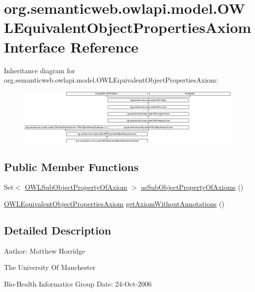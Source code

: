 \hypertarget{interfaceorg_1_1semanticweb_1_1owlapi_1_1model_1_1_o_w_l_equivalent_object_properties_axiom}{\section{org.\-semanticweb.\-owlapi.\-model.\-O\-W\-L\-Equivalent\-Object\-Properties\-Axiom Interface Reference}
\label{interfaceorg_1_1semanticweb_1_1owlapi_1_1model_1_1_o_w_l_equivalent_object_properties_axiom}
}
Inheritance diagram for org.\-semanticweb.\-owlapi.\-model.\-O\-W\-L\-Equivalent\-Object\-Properties\-Axiom\-:\begin{figure}[H]
\begin{center}
\leavevmode
\includegraphics[height=2.750154cm]{interfaceorg_1_1semanticweb_1_1owlapi_1_1model_1_1_o_w_l_equivalent_object_properties_axiom}
\end{center}
\end{figure}
\subsection*{Public Member Functions}
\begin{DoxyCompactItemize}
\item 
Set$<$ \hyperlink{interfaceorg_1_1semanticweb_1_1owlapi_1_1model_1_1_o_w_l_sub_object_property_of_axiom}{O\-W\-L\-Sub\-Object\-Property\-Of\-Axiom} $>$ \hyperlink{interfaceorg_1_1semanticweb_1_1owlapi_1_1model_1_1_o_w_l_equivalent_object_properties_axiom_a6ba77588882866e397d842a13b4c9e25}{as\-Sub\-Object\-Property\-Of\-Axioms} ()
\item 
\hyperlink{interfaceorg_1_1semanticweb_1_1owlapi_1_1model_1_1_o_w_l_equivalent_object_properties_axiom}{O\-W\-L\-Equivalent\-Object\-Properties\-Axiom} \hyperlink{interfaceorg_1_1semanticweb_1_1owlapi_1_1model_1_1_o_w_l_equivalent_object_properties_axiom_ae7441cfc84358352cd9a45ea983d5e9c}{get\-Axiom\-Without\-Annotations} ()
\end{DoxyCompactItemize}


\subsection{Detailed Description}
Author\-: Matthew Horridge\par
 The University Of Manchester\par
 Bio-\/\-Health Informatics Group Date\-: 24-\/\-Oct-\/2006 

